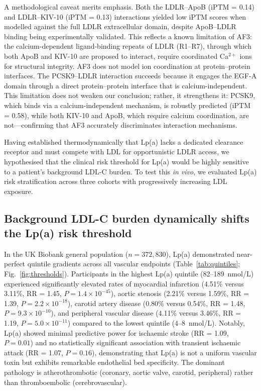 \documentclass[11pt,a4paper]{article}
\newcommand{\lpa}{Lp(a)}
\newcommand{\iptm}{iPTM}
\newcommand{\kiv}{KIV-10}
\newcommand{\ukb}{UK Biobank}
\begin{document}
A methodological caveat merits emphasis. Both the LDLR--ApoB (\iptm{} = 0.14) and LDLR--\kiv{} (\iptm{} = 0.13) interactions yielded low \iptm{} scores when modelled against the full LDLR extracellular domain, despite ApoB--LDLR binding being experimentally validated. This reflects a known limitation of AF3: the calcium-dependent ligand-binding repeats of LDLR (R1--R7), through which both ApoB and \kiv{} are proposed to interact\cite{rudenko2002,jeon2001}, require coordinated Ca$^{2+}$ ions for structural integrity. AF3 does not model ion coordination at protein--protein interfaces\cite{abramson2024}. The PCSK9--LDLR interaction succeeds because it engages the EGF-A domain through a direct protein--protein interface that is calcium-independent\cite{kwon2008}. This limitation does not weaken our conclusion; rather, it strengthens it: PCSK9, which binds via a calcium-independent mechanism, is robustly predicted (\iptm{} = 0.58), while both \kiv{} and ApoB, which require calcium coordination, are not---confirming that AF3 accurately discriminates interaction mechanisms.

Having established thermodynamically that \lpa{} lacks a dedicated clearance receptor and must compete with LDL for opportunistic LDLR access, we hypothesised that the clinical risk threshold for \lpa{} would be highly sensitive to a patient's background LDL-C burden. To test this \textit{in vivo}, we evaluated \lpa{} risk stratification across three cohorts with progressively increasing LDL exposure.

\subsection*{Background LDL-C burden dynamically shifts the \lpa{} risk threshold}

In the \ukb{} general population ($n = 372{,}830$), \lpa{} demonstrated near-perfect quintile gradients across all vascular endpoints (Table~\ref{tab:quintiles}; Fig.~\ref{fig:thresholds}). Participants in the highest \lpa{} quintile (82--189~nmol/L) experienced significantly elevated rates of myocardial infarction (4.51\% versus 3.11\%, RR = 1.45, $P = 1.4 \times 10^{-45}$), aortic stenosis (2.21\% versus 1.59\%, RR = 1.39, $P = 2.2 \times 10^{-18}$), carotid artery disease (0.80\% versus 0.54\%, RR = 1.48, $P = 9.3 \times 10^{-10}$), and peripheral vascular disease (4.11\% versus 3.46\%, RR = 1.19, $P = 5.0 \times 10^{-11}$) compared to the lowest quintile (4--8~nmol/L). Notably, \lpa{} showed minimal predictive power for ischaemic stroke (RR = 1.09, $P = 0.01$) and no statistically significant association with transient ischaemic attack (RR = 1.07, $P = 0.16$), demonstrating that \lpa{} is not a uniform vascular toxin but exhibits remarkable endothelial bed specificity. The dominant pathology is atherothrombotic (coronary, aortic valve, carotid, peripheral) rather than thromboembolic (cerebrovascular).
\end{document}

